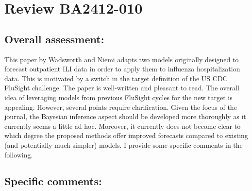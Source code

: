 \documentclass{article}
\begin{document}
  
  
\section*{Review BA2412-010}
\subsection*{Overall assessment:}
This paper by Wadsworth and Niemi adapts two models originally designed to forecast outpatient
ILI data in order to apply them to influenza hospitalization data. This is motivated by a switch in the
target definition of the US CDC FluSight challenge. The paper is well-written and pleasant to read.
The overall idea of leveraging models from previous FluSight cycles for the new target is appealing.
However, several points require clarification. Given the focus of the journal, the Bayesian inference
aspect should be developed more thoroughly as it currently seems a little ad hoc. Moreover, it
currently does not become clear to which degree the proposed methods offer improved forecasts
compared to existing (and potentially much simpler) models. I provide some specific comments in
the following.


\subsection*{Specific comments:}
\end{document}
